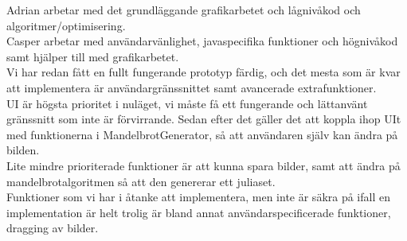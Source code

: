 \documentclass[11pt]{article} %
\begin{document}
Adrian arbetar med det grundläggande grafikarbetet och lågnivåkod och algoritmer/optimisering. \\

Casper arbetar med användarvänlighet, javaspecifika funktioner och högnivåkod samt hjälper till med grafikarbetet. \\

Vi har redan fått en fullt fungerande prototyp färdig, och det mesta som är kvar att implementera är användargränssnittet samt avancerade extrafunktioner. \\

UI är högsta prioritet i nuläget, vi måste få ett fungerande och lättanvänt gränssnitt som inte är förvirrande. Sedan efter det gäller det att koppla ihop UIt med funktionerna i MandelbrotGenerator, så att användaren själv kan ändra på bilden. \\

Lite mindre prioriterade funktioner är att kunna spara bilder, samt att ändra på mandelbrotalgoritmen så att den genererar ett juliaset. \\

Funktioner som vi har i åtanke att implementera, men inte är säkra på ifall en implementation är helt trolig är bland annat användarspecificerade funktioner, dragging av bilder. \\
\end{document}
